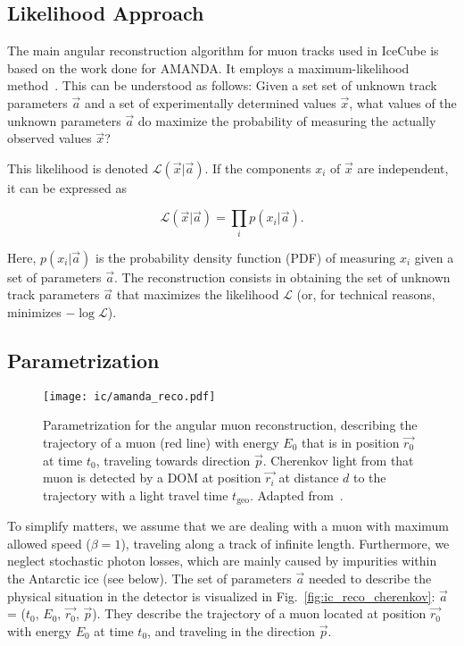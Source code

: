 \subsection{Likelihood Approach}
The main angular reconstruction algorithm for muon tracks used in IceCube is based on the work done for AMANDA. It employs a maximum-likelihood method~. This can be understood as follows: Given a set set of unknown track parameters $\vec{a}$ and a set of experimentally determined values $\vec{x}$, what values of the unknown parameters $\vec{a}$ do maximize the probability of measuring the actually observed values $\vec{x}$?

This likelihood is denoted $\mathcal{L}(\vec{x}|\vec{a})$. If the components $x_i$ of $\vec{x}$ are independent, it can be expressed as

\begin{equation}
    \mathcal{L}(\vec{x}|\vec{a}) = \prod_i p(x_i|\vec{a}).
\end{equation}

Here, $p(x_i|\vec{a})$ is the probability density function (PDF) of measuring $x_i$ given a set of parameters $\vec{a}$. The reconstruction consists in obtaining the set of unknown track parameters $\vec{a}$ that maximizes the likelihood $\mathcal{L}$ (or, for technical reasons, minimizes $-\log{\mathcal{L}}$).

\subsection{Parametrization}
\begin{figure}[htb]
    \texttt{[image: ic/amanda\_reco.pdf]}
    \caption[Angular reconstruction in IceCube]{Parametrization for the angular muon reconstruction, describing the trajectory of a muon (red line) with energy $E_0$ that is in position $\vec{r_0}$ at time $t_0$, traveling towards direction $\vec{p}$. Cherenkov light from that muon is detected by a DOM at position $\vec{r_i}$ at distance $d$ to the trajectory with a light travel time $t_\text{geo}$. Adapted from~\cite{Ahrens2004}.}
\end{figure}

To simplify matters, we assume that we are dealing with a muon with maximum allowed speed ($\beta=1$), traveling along a track of infinite length. Furthermore, we neglect stochastic photon losses, which are mainly caused by impurities within the Antarctic ice (see below). The set of parameters $\vec{a}$ needed to describe the physical situation in the detector is visualized in Fig.~\ref{fig:ic_reco_cherenkov}: $\vec{a}$ = ($t_0$, $E_0$, $\vec{r_0}$, $\vec{p}$). They describe the trajectory of a muon located at position $\vec{r_0}$ with energy $E_0$ at time $t_0$, and traveling in the direction $\vec{p}$.

